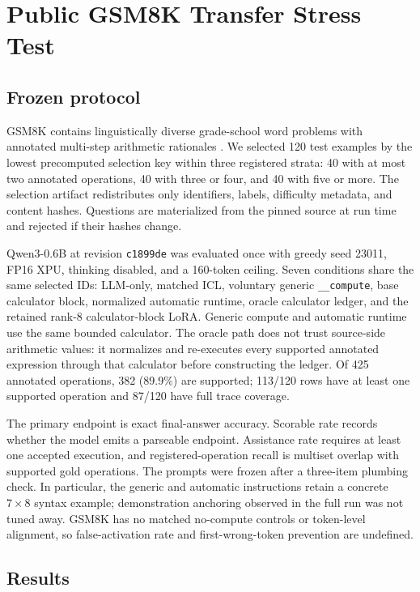 \documentclass[11pt]{article}
\begin{document}
\section{Public GSM8K Transfer Stress Test}

\subsection{Frozen protocol}

GSM8K contains linguistically diverse grade-school word problems with annotated
multi-step arithmetic rationales \cite{gsm8k}. We selected 120 test examples by
the lowest precomputed selection key within three registered strata: 40 with at
most two annotated operations, 40 with three or four, and 40 with five or more.
The selection artifact redistributes only identifiers, labels, difficulty
metadata, and content hashes. Questions are materialized from the pinned source
at run time and rejected if their hashes change.

Qwen3-0.6B at revision \texttt{c1899de} was evaluated once with greedy seed
23011, FP16 XPU, thinking disabled, and a 160-token ceiling. Seven conditions
share the same selected IDs: LLM-only, matched ICL, voluntary generic
\texttt{\_\_compute}, base calculator block, normalized automatic runtime,
oracle calculator ledger, and the retained rank-8 calculator-block LoRA. Generic
compute and automatic runtime use the same bounded calculator. The oracle path
does not trust source-side arithmetic values: it normalizes and re-executes every
supported annotated expression through that calculator before constructing the
ledger. Of 425 annotated operations, 382 (89.9\%) are supported; 113/120 rows
have at least one supported operation and 87/120 have full trace coverage.

The primary endpoint is exact final-answer accuracy. Scorable rate records
whether the model emits a parseable endpoint. Assistance rate requires at least
one accepted execution, and registered-operation recall is multiset overlap with
supported gold operations. The prompts were frozen after a three-item plumbing
check. In particular, the generic and automatic instructions retain a concrete
\(7\times8\) syntax example; demonstration anchoring observed in the full run was
not tuned away. GSM8K has no matched no-compute controls or token-level alignment,
so false-activation rate and first-wrong-token prevention are undefined.

\subsection{Results}
\end{document}
